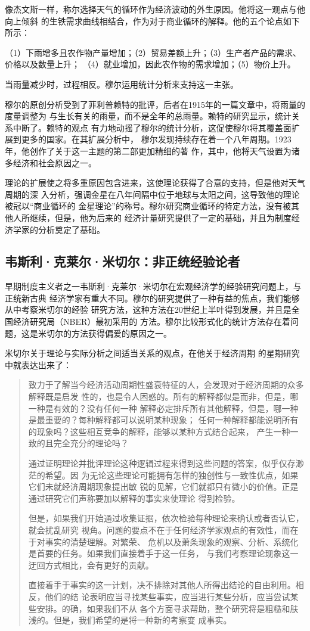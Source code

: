 像杰文斯一样，称尔选择天气的循环作为经济波动的外生原因。他将这一观点与他向上倾斜
的生铁需求曲线相结合，作为对于商业循环的解释。他的五个论点如下所示：

（1）下雨增多且农作物产量增加；（2）贸易差额上升；（3）生产者产品的需求、价格以及数量上升；
（4）就业增加，因此农作物的需求增加；（5）物价上升。

当雨量减少时，过程相反。穆尔运用统计分析来支持这一主张。

穆尔的原创分析受到了菲利普赖特的批评，后者在1915年的一篇文章中，将雨量的度量调整为
与生长有关的雨量，而不是全年的总雨量。赖特的研究显示，统计关系中断了。赖特的观点
有力地动摇了穆尔的统计分析，这促使穆尔将其覆盖面扩展到更多的国家。在其扩展分析中，
穆尔发现持续存在着一个八年周期。1923年，他创作了关于这一主题的第二部更加精细的著
作，其中，他将天气设置为诸多经济和社会原因之一。

理论的扩展使之将多重原因包含进来，这使理论获得了合意的支持，但是他对天气周期的深
入分析，强调金星在八年间隔中位于地球与太阳之间，这导致他的理论被冠以“商业循环的
金星理论”的称号。穆尔研究商业循环的特定方法，没有被其他人所继续，但是，他为后来的
经济计量研究提供了一定的基础，并且为制度经济学家的分析奠定了基础。

\subsection{韦斯利·克莱尔·米切尔：非正统经验论者}

早期制度主义者之一韦斯利·克莱尔·米切尔在宏观经济学的经验研究问题上，与正统新古典
经济学家有重大不同。穆尔的研究提供了一种有益的焦点，我们能够从中考察米切尔的经验
研究方法，这种方法在20世纪上半叶得到发展，并且是全国经济研究局（NBER）最初采用的
方法。穆尔比较形式化的统计方法存在着问题，这是米切尔的方法获得偏爱的原因之一。

米切尔关于理论与实际分析之间适当关系的观点，在他关于经济周期
的星期研究中就表达出来了：
\begin{quotation}
  致力于了解当今经济活动周期性盛衰特征的人，会发现对于经济周期的众多解释既是启发
  性的，也是令人困惑的。所有的解释都似是而非，但是，哪一种是有效的？没有任何一种
  解释必定排斥所有其他解释，但是，哪一种是最重要的？每种解释都可以说明某种现象；
  任何一种解释都能说明所有的现象吗？这些相互竞争的解释，能够以某种方式结合起来，
  产生一种一致的且完全充分的理论吗？

  通过证明理论并批评理论这种逻辑过程来得到这些问题的答案，似乎仅存渺茫的希望。因
  为无论这些理论可能拥有怎样的独创性与一致性优点，如果它们未就经济周期现象提出敏
  锐的见解，它们就都只有微小的价值。正是通过研究它们声称要加以解释的事实来使理论
  得到检验。

  但是，如果我们开始通过收集证据，依次检验每种理论来确认或者否认它，就会扰乱研究
  视角。问题的要点不在于任何经济学家观点的有效性，而在于对事实的清楚理解。对繁荣、
  危机以及萧条现象的观察、分析、系统化是首要的任务。如果我们直接着手于这一任务，
  与我们考察理论现象这一迂回方式相比，会有更好的贡献。

  直接着手于事实的这一计划，决不排除对其他人所得出结论的自由利用。相反，他们的结
  论表明应当寻找某些事实，应当进行某些分析，应当尝试某些安排。的确，如果我们不从
  各个方面寻求帮助，整个研究将是粗糙和肤浅的。但是，我们希望的是将一种新的考察变
  成事实。
\end{quotation}

